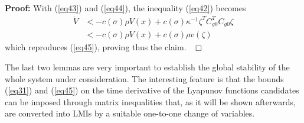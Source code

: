 \documentclass[twocolumn]{autarc_LH}
\newenvironment{proof}{\begin{trivlist} \item[{ \bf Proof:}] }
{~\hfill$\Box$ \end{trivlist} }
\begin{document}
\begin{proof}
With (\ref{eq43}) and (\ref{eq44}), the inequality (\ref{eq42}) becomes  
\begin{align}
		\label{eq46}  \dot V & < -c(\sigma) \rho V(x) +  c(\sigma) \kappa^{-1} \zeta^TC_{g0}^TC_{g0}\zeta \nonumber \\
  & < -c(\sigma) \rho V(x) +  c(\sigma) \rho v(\zeta) 
\end{align}
which reproduces (\ref{eq45}), proving thus the claim. 
\end{proof}
The last two lemmas are very important to establish the global stability of the whole system under consideration. The interesting feature is that the bounds (\ref{eq31}) and (\ref{eq45}) on the time derivative of the Lyapunov functions candidates can be imposed through matrix inequalities that, as it will be shown afterwards, are converted into LMIs by a suitable one-to-one change of variables. 
\end{document}
